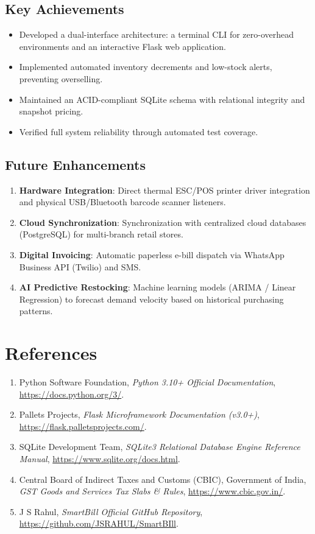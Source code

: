 \documentclass[12pt,a4paper]{article}
\begin{document}
\subsection{Key Achievements}
\begin{itemize}
    \item Developed a dual-interface architecture: a terminal CLI for zero-overhead environments and an interactive Flask web application.
    \item Implemented automated inventory decrements and low-stock alerts, preventing overselling.
    \item Maintained an ACID-compliant SQLite schema with relational integrity and snapshot pricing.
    \item Verified full system reliability through automated test coverage.
\end{itemize}

\subsection{Future Enhancements}
\begin{enumerate}
    \item \textbf{Hardware Integration}: Direct thermal ESC/POS printer driver integration and physical USB/Bluetooth barcode scanner listeners.
    \item \textbf{Cloud Synchronization}: Synchronization with centralized cloud databases (PostgreSQL) for multi-branch retail stores.
    \item \textbf{Digital Invoicing}: Automatic paperless e-bill dispatch via WhatsApp Business API (Twilio) and SMS.
    \item \textbf{AI Predictive Restocking}: Machine learning models (ARIMA / Linear Regression) to forecast demand velocity based on historical purchasing patterns.
\end{enumerate}

\section*{References}
\begin{enumerate}
    \item Python Software Foundation, \textit{Python 3.10+ Official Documentation}, \url{https://docs.python.org/3/}.
    \item Pallets Projects, \textit{Flask Microframework Documentation (v3.0+)}, \url{https://flask.palletsprojects.com/}.
    \item SQLite Development Team, \textit{SQLite3 Relational Database Engine Reference Manual}, \url{https://www.sqlite.org/docs.html}.
    \item Central Board of Indirect Taxes and Customs (CBIC), Government of India, \textit{GST Goods and Services Tax Slabs \& Rules}, \url{https://www.cbic.gov.in/}.
    \item J S Rahul, \textit{SmartBill Official GitHub Repository}, \url{https://github.com/JSRAHUL/SmartBIll}.
\end{enumerate}
\end{document}
